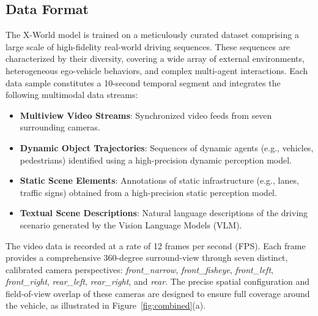 \subsection{Data Format}
The X-World model is trained on a meticulously curated dataset comprising a large scale of high-fidelity real-world driving sequences. These sequences are characterized by their diversity, covering a wide array of external environments, heterogeneous ego-vehicle behaviors, and complex multi-agent interactions. Each data sample constitutes a 10-second temporal segment and integrates the following multimodal data streams:

\begin{itemize}
    \item \textbf{Multiview Video Streams}: Synchronized video feeds from seven surrounding cameras.
    \item \textbf{Dynamic Object Trajectories}: Sequences of dynamic agents (e.g., vehicles, pedestrians) identified using a high-precision dynamic perception model.
    \item \textbf{Static Scene Elements}: Annotations of static infrastructure (e.g., lanes, traffic signs) obtained from a high-precision static perception model.
    \item \textbf{Textual Scene Descriptions}: Natural language descriptions of the driving scenario generated by the Vision Language Models (VLM).
\end{itemize}

The video data is recorded at a rate of 12 frames per second (FPS). Each frame provides a comprehensive 360-degree surround-view through seven distinct, calibrated camera perspectives: \textit{front\_narrow}, \textit{front\_fisheye}, \textit{front\_left}, \textit{front\_right}, \textit{rear\_left}, \textit{rear\_right}, and \textit{rear}. The precise spatial configuration and field-of-view overlap of these cameras are designed to ensure full coverage around the vehicle, as illustrated in Figure~\ref{fig:combined}(a).

